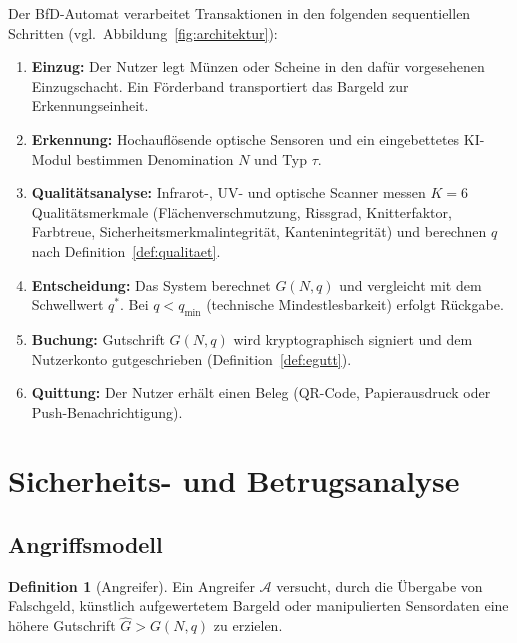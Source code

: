 ﻿\documentclass[a4paper,12pt]{article}
\theoremstyle{definition}
\newtheorem{definition}{Definition}
\begin{document}
Der BfD-Automat verarbeitet Transaktionen in den folgenden sequentiellen
Schritten (vgl.\ Abbildung~\ref{fig:architektur}):

\begin{enumerate}
  \item \textbf{Einzug:} Der Nutzer legt Münzen oder Scheine in den dafür vorgesehenen
        Einzugschacht.  Ein Förderband transportiert das Bargeld zur Erkennungseinheit.
  \item \textbf{Erkennung:} Hochauflösende optische Sensoren und ein eingebettetes
        KI-Modul bestimmen Denomination $N$ und Typ $\tau$.
  \item \textbf{Qualitätsanalyse:} Infrarot-, UV- und optische Scanner messen
        $K = 6$ Qualitätsmerkmale (Flächenverschmutzung, Rissgrad, Knitterfaktor,
        Farbtreue, Sicherheitsmerkmalintegrität, Kantenintegrität)
        und berechnen $q$ nach Definition~\ref{def:qualitaet}.
  \item \textbf{Entscheidung:} Das System berechnet $G(N,q)$ und vergleicht mit dem
        Schwellwert $q^*$.  Bei $q < q_{\min}$ (technische Mindestlesbarkeit) erfolgt
        Rückgabe.
  \item \textbf{Buchung:} Gutschrift $G(N,q)$ wird kryptographisch signiert und
        dem Nutzerkonto gutgeschrieben (Definition~\ref{def:egutt}).
  \item \textbf{Quittung:} Der Nutzer erhält einen Beleg (QR-Code, Papierausdruck
        oder Push-Benachrichtigung).
\end{enumerate}

\section{Sicherheits- und Betrugsanalyse}
\label{sec:sicherheit}

\subsection{Angriffsmodell}

\begin{definition}[Angreifer]
Ein Angreifer $\mathcal{A}$ versucht, durch die Übergabe von Falschgeld,
künstlich aufgewertetem Bargeld oder manipulierten Sensordaten eine höhere
Gutschrift $\hat{G} > G(N,q)$ zu erzielen.
\end{definition}
\end{document}

